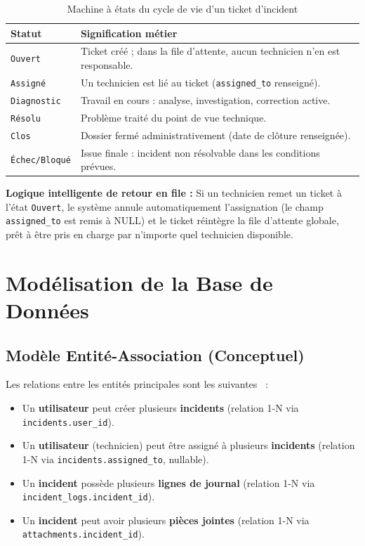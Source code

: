 \begin{table}[H]
\centering
\begin{tabular}{@{}p{3cm}p{9cm}@{}}
\toprule
\textbf{Statut} & \textbf{Signification métier} \\ \midrule
\texttt{Ouvert} & Ticket créé ; dans la file d'attente, aucun technicien n'en est responsable. \\
\texttt{Assigné} & Un technicien est lié au ticket (\texttt{assigned\_to} renseigné). \\
\texttt{Diagnostic} & Travail en cours : analyse, investigation, correction active. \\
\texttt{Résolu} & Problème traité du point de vue technique. \\
\texttt{Clos} & Dossier fermé administrativement (date de clôture renseignée). \\
\texttt{Échec/Bloqué} & Issue finale : incident non résolvable dans les conditions prévues. \\ \bottomrule
\end{tabular}
\caption{Machine à états du cycle de vie d'un ticket d'incident}
\label{tab:lifecycle}
\end{table}

\noindent\textbf{Logique intelligente de retour en file :} Si un technicien remet un
ticket à l'état \texttt{Ouvert}, le système annule automatiquement l'assignation
(le champ \texttt{assigned\_to} est remis à NULL) et le ticket réintègre la file
d'attente globale, prêt à être pris en charge par n'importe quel technicien disponible.

\section{Modélisation de la Base de Données}

\subsection{Modèle Entité-Association (Conceptuel)}
Les relations entre les entités principales sont les suivantes~\cite{roques2006} :
\begin{itemize}
    \item Un \textbf{utilisateur} peut créer plusieurs \textbf{incidents}
    (relation 1-N via \texttt{incidents.user\_id}).
    \item Un \textbf{utilisateur} (technicien) peut être assigné à plusieurs
    \textbf{incidents} (relation 1-N via \texttt{incidents.assigned\_to}, nullable).
    \item Un \textbf{incident} possède plusieurs \textbf{lignes de journal}
    (relation 1-N via \texttt{incident\_logs.incident\_id}).
    \item Un \textbf{incident} peut avoir plusieurs \textbf{pièces jointes}
    (relation 1-N via \texttt{attachments.incident\_id}).
\end{itemize}

